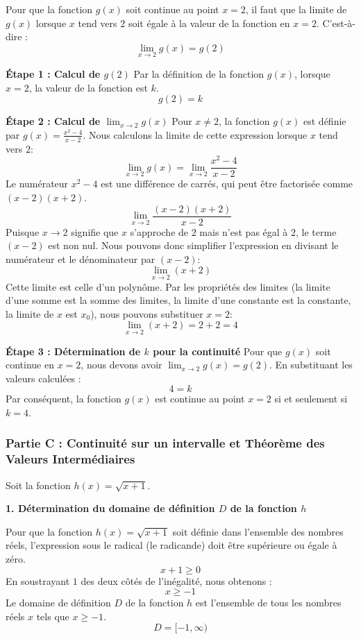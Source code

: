 \documentclass[12pt,a4paper]{report}
\begin{document}
Pour que la fonction $g(x)$ soit continue au point $x = 2$, il faut que la limite de $g(x)$ lorsque $x$ tend vers $2$ soit égale à la valeur de la fonction en $x = 2$. C'est-à-dire :
$$ \lim_{x \to 2} g(x) = g(2) $$

\textbf{Étape 1 : Calcul de $g(2)$}
Par la définition de la fonction $g(x)$, lorsque $x = 2$, la valeur de la fonction est $k$.
$$ g(2) = k $$

\textbf{Étape 2 : Calcul de $\lim_{x \to 2} g(x)$}
Pour $x \neq 2$, la fonction $g(x)$ est définie par $g(x) = \frac{x^2 - 4}{x - 2}$.
Nous calculons la limite de cette expression lorsque $x$ tend vers $2$:
$$ \lim_{x \to 2} g(x) = \lim_{x \to 2} \frac{x^2 - 4}{x - 2} $$
Le numérateur $x^2 - 4$ est une différence de carrés, qui peut être factorisée comme $(x-2)(x+2)$.
$$ \lim_{x \to 2} \frac{(x-2)(x+2)}{x - 2} $$
Puisque $x \to 2$ signifie que $x$ s'approche de $2$ mais n'est pas égal à $2$, le terme $(x-2)$ est non nul. Nous pouvons donc simplifier l'expression en divisant le numérateur et le dénominateur par $(x-2)$:
$$ \lim_{x \to 2} (x+2) $$
Cette limite est celle d'un polynôme. Par les propriétés des limites (la limite d'une somme est la somme des limites, la limite d'une constante est la constante, la limite de $x$ est $x_0$), nous pouvons substituer $x=2$:
$$ \lim_{x \to 2} (x+2) = 2 + 2 = 4 $$

\textbf{Étape 3 : Détermination de $k$ pour la continuité}
Pour que $g(x)$ soit continue en $x=2$, nous devons avoir $\lim_{x \to 2} g(x) = g(2)$.
En substituant les valeurs calculées :
$$ 4 = k $$
Par conséquent, la fonction $g(x)$ est continue au point $x=2$ si et seulement si $k=4$.

\subsubsection{Partie C : Continuité sur un intervalle et Théorème des Valeurs Intermédiaires}

Soit la fonction $h(x) = \sqrt{x+1}$.

\textbf{1. Détermination du domaine de définition $D$ de la fonction $h$}

Pour que la fonction $h(x) = \sqrt{x+1}$ soit définie dans l'ensemble des nombres réels, l'expression sous le radical (le radicande) doit être supérieure ou égale à zéro.
$$ x+1 \ge 0 $$
En soustrayant $1$ des deux côtés de l'inégalité, nous obtenons :
$$ x \ge -1 $$
Le domaine de définition $D$ de la fonction $h$ est l'ensemble de tous les nombres réels $x$ tels que $x \ge -1$.
$$ D = [-1, \infty) $$
\end{document}
